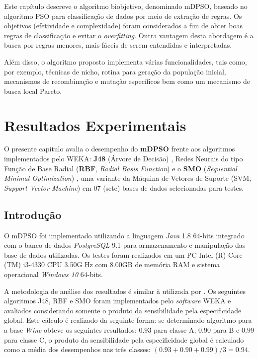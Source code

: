\documentclass[
	12pt,				%
	openany,			%
	oneside,	
	a4paper,			%
	brazil,				%
	]{unimontes-ppgmsc-abntex2}
\begin{document}
Este capítulo descreve o algoritmo biobjetivo, denominado mDPSO, baseado no algoritmo PSO para classificação de dados por meio de extração de regras. Os objetivos (efetividade e complexidade) foram considerados a fim de obter boas regras de classificação e evitar o {\em overfitting}. Outra vantagem desta abordagem é a busca por regras menores, mais fáceis de serem entendidas e interpretadas.  

Além disso, o algoritmo proposto implementa várias funcionalidades, tais como, por exemplo, técnicas de nicho, rotina para geração da população inicial, mecanismos de recombinação e mutação específicos bem como um mecanismo de busca local Pareto. 




\chapter{Resultados Experimentais}
\label{ch:resultados}

O presente capítulo avalia o desempenho do \textbf{mDPSO} frente aos algoritmos implementados pelo WEKA: \textbf{J48} (Árvore de Decisão) \cite{Quinlan_1986},  Redes Neurais do tipo Função de Base Radial (\textbf{RBF}, {\em Radial Basis Function}) \cite{Broomhead_1988} e o \textbf{SMO} ({\em Sequential Minimal Optimization}) \cite{Keerthi_2001}, uma variante da Máquina de Vetores de Suporte (SVM, {\em Support Vector Machine}) em 07 (sete) bases de dados selecionadas para testes.

\section{Introdução}

O mDPSO foi implementado utilizando a linguagem {\em Java} 1.8 64-bits integrado com o banco de dados {\em PostgreSQL} 9.1 para armazenamento e manipulação das base de dados utilizadas. Os testes foram realizados em um PC Intel (R) Core (TM) i3-4330 CPU 3.50G Hz com 8.00GB de memória RAM e sistema operacional {\em Windows 10} 64-bits.

A metodologia de análise dos resultados é similar à utilizada por . Os seguintes algoritmos J48, RBF e SMO foram implementados pelo {\em software} WEKA e avaliados considerando somente o produto da sensibilidade pela especificidade global. Este cálculo é realizado da seguinte forma: se determinado algoritmo para a base {\em Wine} obteve os seguintes resultados: $0.93$ para classe A; $0.90$ para B e $0.99$ para classe C, o produto da sensibilidade pela especificidade global é calculado como a média dos desempenhos nas três classes: $(0.93+0.90+0.99)/3 = 0.94$. 
\end{document}

